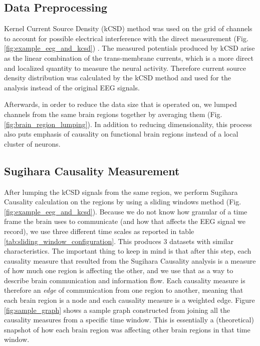 \documentclass[journal,12pt,onecolumn,draftclsnofoot]{IEEEtran}  %
\begin{document}
\subsection{Data Preprocessing}
Kernel Current Source Density (kCSD) method was used on the grid of channels to account for possible electrical interference with the direct measurement (Fig. \ref{fig:example_eeg_and_kcsd}) \cite{Potworowski2012}. The measured potentials produced by kCSD arise as the linear combination of the trans-membrane currents, which is a more direct and localized quantity to measure the neural activity. Therefore current source density distribution was calculated by the kCSD method and used for the analysis instead of the original EEG signals.

Afterwards, in order to reduce the data size that is operated on, we lumped channels from the same brain regions together by averaging them (Fig. \ref{fig:brain_region_lumping}). In addition to reducing dimensionality, this process also puts emphasis of causality on functional brain regions instead of a local cluster of neurons. 

\subsection{Sugihara Causality Measurement}
After lumping the kCSD signals from the same region, we perform Sugihara Causality calculation on the regions by using a sliding windows method (Fig. \ref{fig:example_eeg_and_kcsd}). Because we do not know how granular of a time frame the brain uses to communicate (and how that affects the EEG signal we record), we use three different time scales as reported in table \ref{tab:sliding_window_configuration}. This produces 3 datasets with similar characteristics. The important thing to keep in mind is that after this step, each causality measure that resulted from the Sugihara Causality analysis is a measure of how much one region is affecting the other, and we use that as a way to describe brain communication and information flow. Each causality measure is therefore an \textit{edge} of communication from one region to another, meaning that each brain region is a node and each causality measure is a weighted edge. Figure \ref{fig:sample_graph} shows a sample graph constructed from joining all the causality measures from a specific time window. This is essentially a (theoretical) snapshot of how each brain region was affecting other brain regions in that time window.
\end{document}
